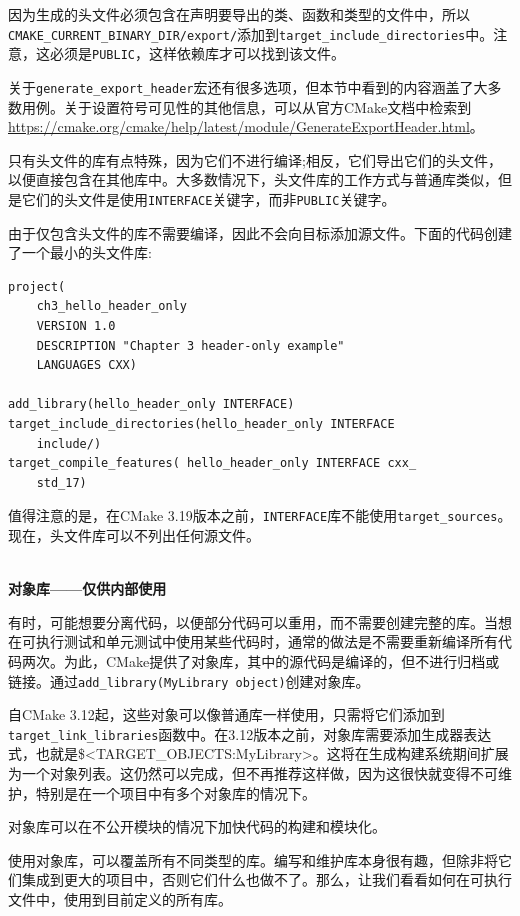 因为生成的头文件必须包含在声明要导出的类、函数和类型的文件中，所以\texttt{CMAKE\_CURRENT\_BINARY\_DIR/export/}添加到\texttt{target\_include\_directories}中。注意，这必须是\texttt{PUBLIC}，这样依赖库才可以找到该文件。

关于\texttt{generate\_export\_header}宏还有很多选项，但本节中看到的内容涵盖了大多数用例。关于设置符号可见性的其他信息，可以从官方CMake文档中检索到\url{https://cmake.org/cmake/help/latest/module/GenerateExportHeader.html}。


只有头文件的库有点特殊，因为它们不进行编译;相反，它们导出它们的头文件，以便直接包含在其他库中。大多数情况下，头文件库的工作方式与普通库类似，但是它们的头文件是使用\texttt{INTERFACE}关键字，而非\texttt{PUBLIC}关键字。

由于仅包含头文件的库不需要编译，因此不会向目标添加源文件。下面的代码创建了一个最小的头文件库:

\begin{lstlisting}[style=styleCMake]
project(
	ch3_hello_header_only
	VERSION 1.0
	DESCRIPTION "Chapter 3 header-only example"
	LANGUAGES CXX)

add_library(hello_header_only INTERFACE)
target_include_directories(hello_header_only INTERFACE
	include/)
target_compile_features( hello_header_only INTERFACE cxx_
	std_17)
\end{lstlisting}

值得注意的是，在CMake 3.19版本之前，\texttt{INTERFACE}库不能使用\texttt{target\_sources}。现在，头文件库可以不列出任何源文件。

\hspace*{\fill} \\ %
\noindent
\textbf{对象库——仅供内部使用}

有时，可能想要分离代码，以便部分代码可以重用，而不需要创建完整的库。当想在可执行测试和单元测试中使用某些代码时，通常的做法是不需要重新编译所有代码两次。为此，CMake提供了对象库，其中的源代码是编译的，但不进行归档或链接。通过\texttt{add\_library(MyLibrary object)}创建对象库。

自CMake 3.12起，这些对象可以像普通库一样使用，只需将它们添加到\texttt{target\_link\_libraries}函数中。在3.12版本之前，对象库需要添加生成器表达式，也就是\$<TARGET\_OBJECTS:MyLibrary>。这将在生成构建系统期间扩展为一个对象列表。这仍然可以完成，但不再推荐这样做，因为这很快就变得不可维护，特别是在一个项目中有多个对象库的情况下。

\begin{tcolorbox}[colback=blue!5!white,colframe=blue!75!black,title=何时使用对象库]
对象库可以在不公开模块的情况下加快代码的构建和模块化。
\end{tcolorbox}

使用对象库，可以覆盖所有不同类型的库。编写和维护库本身很有趣，但除非将它们集成到更大的项目中，否则它们什么也做不了。那么，让我们看看如何在可执行文件中，使用到目前定义的所有库。








